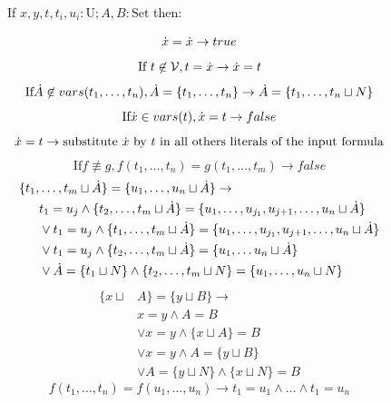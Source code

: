 \documentclass[12pt,a4paper,openright]{book} %
\begin{document}
\begin{figure}
	\begin{tcolorbox}[colframe=black, colback=white, sharp corners]
		\setcounter{equation}{0}
		\renewcommand{\theequation}{=\textsubscript{\arabic{equation}}}
		
		If $x, y, t, t_i, u_i: \text{U}; A,B: \text{Set}$ then:
		
		\begin{equation}
		\dot{x} = \dot{x} \to true
		\end{equation}
		\begin{equation}
		\text{If } t \not\in \mathcal{V}, t = \dot{x} \to \\ \dot{x} = t
		\end{equation}
		\begin{equation}
		\text{If} \dot{A} \not\in vars(t_1, \ldots, t_n), \dot{A} = \{ t_1, \ldots, t_n \} \to \dot{A} = \{ t_1, \ldots, t_n \sqcup N \}
		\end{equation}
		\begin{equation}
		\text{If} \dot{x} \in vars(t), \dot{x} = t \to false
		\end{equation}
		\begin{equation}
		\dot{x} = t \to \text{substitute $\dot{x}$ by $t$ in all others literals of the input formula}
		\end{equation}
		\begin{equation}
		\text{If} f \not\equiv g, f(t_1, \ldots, t_n) = g(t_1, \ldots, t_m) \to false
		\end{equation}
		\begin{equation}
		\begin{split}
		\{ t_1, & \ldots, t_m \sqcup \dot{A} \} = \{u_1, \ldots, u_n \sqcup \dot{A} \} \to \\
		& t_1 = u_j \land \{ t_2, \ldots, t_m \sqcup \dot{A} \} = \{ u_1, \ldots, u_{j_1}, u_{j+1}, \ldots, u_n \sqcup \dot{A} \} \\
		& \lor t_1 = u_j \land \{ t_1, \ldots, t_m \sqcup \dot{A} \} = \{ u_1, \ldots, u_{j_1}, u_{j+1}, \ldots, u_n \sqcup \dot{A} \} \\
		& \lor t_1 = u_j \land \{ t_2, \ldots, t_m \sqcup \dot{A} \} = \{ u_1, \ldots u_n \sqcup \dot{A} \} \\
		& \lor \dot{A} = \{ t_1 \sqcup N \} \land \{ t_2, \ldots, t_m \sqcup N \} = \{ u_1, \ldots, u_n \sqcup N \}
		\end{split}
		\end{equation}
		\begin{equation}
		\begin{split}
		\{ x \sqcup & A \} = \{ y \sqcup B \} \to \\
		& x = y \land A = B \\
		& \lor x = y \land \{ x \sqcup A \} = B \\
		& \lor x = y \land A = \{ y \sqcup B \} \\
		& \lor A = \{ y \sqcup N \} \land \{ x \sqcup N \} = B
		\end{split}
		\end{equation}
		\begin{equation}
		f(t_1, \ldots, t_n) = f(u_1, \ldots, u_n) \to t_1 = u_1 \land \ldots \land t_1 = u_n
		\end{equation}
		

\end{tcolorbox}
\end{figure}
\end{document}

